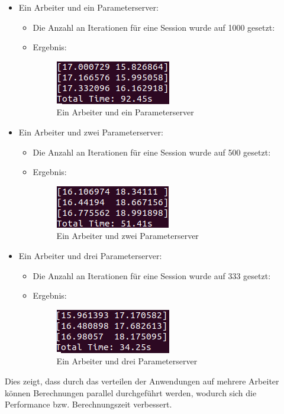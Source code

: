\begin{itemize}
	\item Ein Arbeiter und ein Parameterserver:
	\begin{itemize}
		\item Die Anzahl an Iterationen für eine Session wurde auf 1000 gesetzt:
		\item Ergebnis:
		\vspace{-2mm}
			\begin{figure}[!h]
				\centering
				\includegraphics[width=0.5\linewidth]{Pictures/1worker1ps}
				\caption{Ein Arbeiter und ein Parameterserver}
				\label{fig:1worker1ps}
			\end{figure}
		\vspace{-5mm}
	\end{itemize}
	\item Ein Arbeiter und zwei Parameterserver:
	\begin{itemize}
		\item Die Anzahl an Iterationen für eine Session wurde auf 500 gesetzt:
		\item Ergebnis:
		\vspace{-2mm}
			\begin{figure}[!h]
				\centering
				\includegraphics[width=0.5\linewidth]{Pictures/2worker1ps}
				\caption{Ein Arbeiter und zwei Parameterserver}
				\label{fig:2worker1ps}
			\end{figure}
		\vspace{-5mm}
	\end{itemize}
	\item Ein Arbeiter und drei Parameterserver:
	\begin{itemize}
		\item Die Anzahl an Iterationen für eine Session wurde auf 333 gesetzt:
		\item Ergebnis:
		\vspace{-2mm}
			\begin{figure}[!h]
				\centering
				\includegraphics[width=0.5\linewidth]{Pictures/3worker1ps}
				\caption{Ein Arbeiter und drei Parameterserver}
				\label{fig:3worker1ps}
			\end{figure}	
		\vspace{-5mm}		
	\end{itemize}
\end{itemize}

Dies zeigt, dass durch das verteilen der Anwendungen auf mehrere Arbeiter können Berechnungen parallel durchgeführt werden, wodurch sich die Performance bzw. Berechnungszeit verbessert.